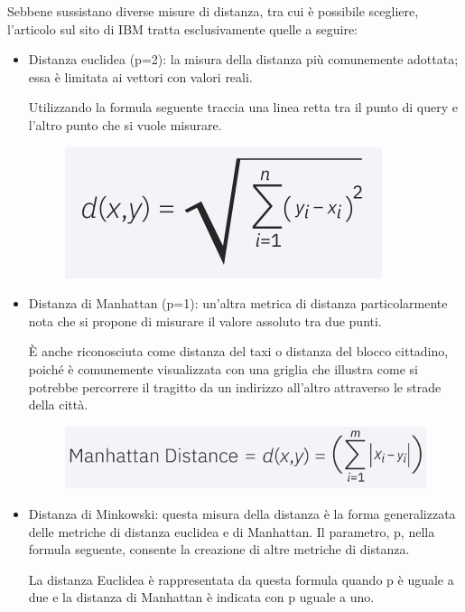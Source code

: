 Sebbene sussistano diverse misure di distanza, tra cui è possibile scegliere, l’articolo sul sito di IBM tratta esclusivamente quelle a seguire:
\begin{itemize}
    \item Distanza euclidea (p=2): la misura della distanza più comunemente adottata; essa è limitata ai vettori con valori reali. 
    
    Utilizzando la formula seguente traccia una linea retta tra il punto di query e l'altro punto che si vuole misurare.
    \begin{figure}
        \begin{center}    
            \includegraphics[width=0.45\linewidth]{images/image12.png}
        \end{center}
    \end{figure}
    \item Distanza di Manhattan (p=1): un'altra metrica di distanza particolarmente nota che si propone di misurare il valore assoluto tra due punti. 
    
    È anche riconosciuta come distanza del taxi o distanza del blocco cittadino, poiché è comunemente visualizzata con una griglia che illustra come si potrebbe percorrere il tragitto da un indirizzo all'altro attraverso le strade della città.
    \begin{figure}
        \begin{center}    
            \includegraphics[width=0.45\linewidth]{images/image13.png}
        \end{center}
    \end{figure}
    \item Distanza di Minkowski: questa misura della distanza è la forma generalizzata delle metriche di distanza euclidea e di Manhattan. Il parametro, p, nella formula seguente, consente la creazione di altre metriche di distanza.    
    
    La distanza Euclidea è rappresentata da questa formula quando p è uguale a due e la distanza di Manhattan è indicata con p uguale a uno.


\end{itemize}
